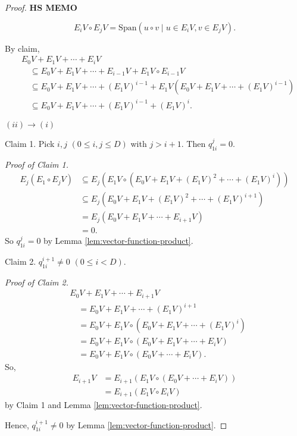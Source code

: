\documentclass[
]{book}
\theoremstyle{definition}
\theoremstyle{definition}
\theoremstyle{definition}
\theoremstyle{definition}
\theoremstyle{remark}
\begin{document}
\begin{proof}
\textbf{HS MEMO}

\[E_iV \circ E_jV = \mathrm{Span}(u\circ v \mid u\in E_iV, v\in E_jV).\]

By claim,
\begin{align}
& E_0V + E_1V + \cdots + E_iV\\
& \quad \subseteq E_0V + E_1V + \cdots + E_{i-1}V + E_1V\circ E_{i-1}V\\
& \quad \subseteq E_0V + E_1V + \cdots + (E_{1}V)^{i-1} + E_1V(E_0V + E_1V + \cdots + (E_{1}V)^{i-1})\\
& \quad \subseteq E_0V  + E_1V + \cdots + (E_{1}V)^{i-1} + (E_1V)^{i}.
\end{align}

\((ii)\to(i)\)

Claim 1. Pick \(i, j\) \((0\leq i,j\leq D)\) with \(j>i+1\). Then \(q^j_{1i} = 0\).

\emph{Proof of Claim 1.}
\begin{align}
E_j(E_1\circ E_jV) & \subseteq E_j(E_1V\circ(E_0V + E_1V + (E_1V)^2 + \cdots + (E_1V)^i))\\
& \subseteq E_j(E_0V + E_1V + (E_1V)^2 + \cdots + (E_1V)^{i+1})\\
& = E_j(E_0V + E_1V + \cdots + E_{i+1}V)\\
& = 0.
\end{align}
So \(q^j_{1i}=0\) by Lemma \ref{lem:vector-function-product}.

Claim 2. \(q^{i+1}_{1i} \neq 0\) \((0\leq i < D)\).

\emph{Proof of Claim 2.}
\begin{align}
& E_0V + E_1V + \cdots + E_{i+1}V\\
& \quad = E_0V + E_1V + \cdots + (E_1V)^{i+1}\\
& \quad = E_0V + E_1V\circ(E_0V + E_1V + \cdots + (E_{1}V)^{i})\\
& \quad = E_0V + E_1V\circ(E_0V + E_1V + \cdots + E_iV)\\
& \quad = E_0V  + E_1V\circ(E_0V + \cdots + E_iV).
\end{align}
So,
\begin{align}
E_{i+1}V & = E_{i+1}(E_1V\circ (E_0V + \cdots + E_iV))\\
& = E_{i+1}(E_1V \circ E_iV)
\end{align}
by Claim 1 and Lemma \ref{lem:vector-function-product}.

Hence, \(q^{i+1}_{1i}\neq 0\) by Lemma \ref{lem:vector-function-product}.

\end{proof}
\end{document}
